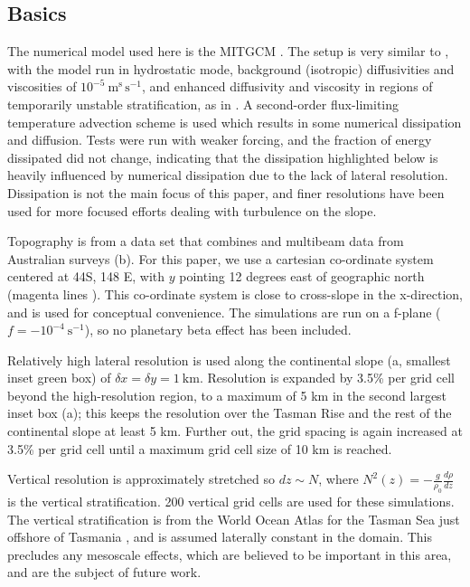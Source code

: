 \documentclass[10pt]{article}
\begin{document}
\subsection{Basics}

The numerical model used here is the MITGCM \citep{marshalletal06}.  The setup is very similar to \citet{buijsmanetal14}, with the model run in hydrostatic mode, background (isotropic) diffusivities and viscosities of $10^{-5}\ \mathrm{m^s\,s^{-1}}$, and enhanced diffusivity and viscosity in regions of temporarily unstable stratification, as in \citet{klymaklegg10}.  A second-order flux-limiting temperature advection scheme is used which results in some numerical dissipation and diffusion.  Tests were run with weaker forcing, and the fraction of energy dissipated did not change, indicating that the dissipation highlighted below is heavily influenced by numerical dissipation due to the lack of lateral resolution. Dissipation is not the main focus of this paper, and finer resolutions have been used for more focused efforts dealing with turbulence on the slope.

Topography is from a data set that combines \citet{smithsandwell97} and multibeam data from Australian surveys \citep{Whiteway09a} (b).  For this paper, we use a cartesian co-ordinate system centered at 44S, 148 E, with $y$ pointing 12 degrees east of geographic north (magenta lines ).  This co-ordinate system is close to cross-slope in the x-direction, and is used for conceptual convenience.  The simulations are run on a f-plane ($f=-10^{-4}\ \mathrm{s^{-1}}$), so no planetary beta effect has been included.  

Relatively high lateral resolution is used along the continental slope (a, smallest inset green box) of $\delta x=\delta y=1\ \mathrm{km}$.  Resolution is expanded by 3.5\% per grid cell beyond the high-resolution region, to a maximum of 5 km in the second largest inset box (a); this keeps the resolution over the Tasman Rise and the rest of the continental slope at least 5 km.  Further out, the grid spacing is again increased at 3.5\% per grid cell until a maximum grid cell size of 10 km is reached.  

Vertical resolution is approximately stretched so $dz\sim N$, where $N^2(z)=-\frac{g}{\rho_0}\frac{d\rho}{dz}$ is the vertical stratification.  200 vertical grid cells are used for these simulations. The vertical stratification is from the World Ocean Atlas for the Tasman Sea just offshore of Tasmania \citep{woa13}, and is assumed laterally constant in the domain.  This precludes any mesoscale effects, which are believed to be important in this area, and are the subject of future work.
\end{document}
